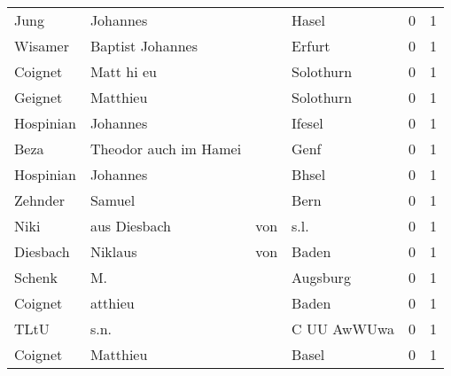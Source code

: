 \begin{center}
\begin{tiny}
\begin{longtabu}{llllrr}
                     Jung &                           Johannes &             &                                       Hasel &          0 &         1 \\
                  Wisamer &                   Baptist Johannes &             &                                      Erfurt &          0 &         1 \\
                  Coignet &                         Matt hi eu &             &                                   Solothurn &          0 &         1 \\
                  Geignet &                           Matthieu &             &                                   Solothurn &          0 &         1 \\
                Hospinian &                           Johannes &             &                                      Ifesel &          0 &         1 \\
                     Beza &              Theodor auch im Hamei &             &                                        Genf &          0 &         1 \\
                Hospinian &                           Johannes &             &                                       Bhsel &          0 &         1 \\
                  Zehnder &                             Samuel &             &                                        Bern &          0 &         1 \\
                     Niki &                      aus  Diesbach &         von &                                        s.l. &          0 &         1 \\
                 Diesbach &                            Niklaus &         von &                                       Baden &          0 &         1 \\
                   Schenk &                                 M. &             &                                    Augsburg &          0 &         1 \\
                  Coignet &                            atthieu &             &                                       Baden &          0 &         1 \\
                     TLtU &                               s.n. &             &                                 C UU AwWUwa &          0 &         1 \\
                  Coignet &                           Matthieu &             &                                       Basel &          0 &         1 \\

\end{longtabu}
\end{tiny}
\end{center}
